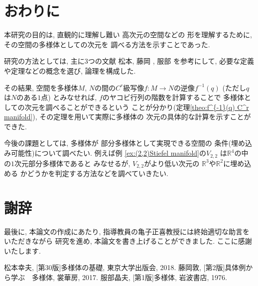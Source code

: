 \documentclass[a4j,12pt]{jarticle}
\theoremstyle{definition}
\begin{document}
\section{おわりに}
本研究の目的は, 直観的に理解し難い
高次元の空間などの
形を理解するために, 
その空間の多様体としての次元を
調べる方法を示すことであった. 

研究の方法としては, 主に$3$つの文献
松本\cite{Matsumoto18}, 藤岡
\cite{Hujioka17}, 服部
\cite{Hattori76}を参考にして, 
必要な定義や定理などの概念を選び, 
論理を構成した. 

その結果, 
空間を多様体$M$, $N$の間の$C^r$級写像$f:M\to N$の逆像$f^{-1}(q)$
(ただし$q$は$N$のある$1$点)
とみなせれば, $f$のヤコビ行列の階数を計算することで
多様体としての次元を調べることができるという
ことが分かり(定理\ref{theo:f^{-1}(q) C^r manifold}), 
その定理を用いて実際に多様体の
次元の具体的な計算を示すことができた. 

今後の課題としては, 多様体が
部分多様体として実現できる空間の
条件(埋め込み可能性)について調べたい. 例えば例
\ref{ex:(2,2)Stiefel manifold}の$V_{2,2}$
は$\mathbb{R}^4$の中の$1$次元部分多様体であると
みなせるが, $V_{2,2}$がより低い次元の
$\mathbb{R}^3$や$\mathbb{R}^2$に埋め込める
かどうかを判定する方法などを調べていきたい. 

\section{謝辞}
最後に, 本論文の作成にあたり, 
指導教員の亀子正喜教授には終始適切な助言をいただきながら
研究を進め, 本論文を書き上げることができました. 
ここに感謝いたします. 
\newpage
\begin{thebibliography}{99}
 松本幸夫, [第30版]多様体の基礎, 東京大学出版会, 2018.
 藤岡敦, [第2版]具体例から学ぶ　多様体, 裳華房, 2017.
 服部晶夫, [第1版]多様体, 岩波書店, 1976.
\end{thebibliography}
\end{document}

